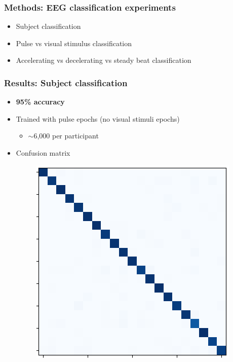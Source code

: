 \documentclass{beamer}
\begin{document}
\begin{frame}
	\frametitle{Methods: EEG classification experiments}

	\begin{itemize}
		
		\item Subject classification 

		\item Pulse vs visual stimulus classification

		\item Accelerating vs decelerating vs steady beat classification

	\end{itemize}

\end{frame}

\begin{frame}
	\frametitle{Results: Subject classification}

	\begin{itemize}
		
		\item \textbf{95\% accuracy}

		\item Trained with pulse epochs (no visual stimuli epochs) 
		\begin{itemize}
			\item $\mathtt{\sim}$6,000 per participant
		\end{itemize}

		\item Confusion matrix
		\begin{figure}
			\centering
			\includegraphics[scale=0.6]{fig14.png}
		\end{figure}
	\end{itemize}

\end{frame}
\end{document}
